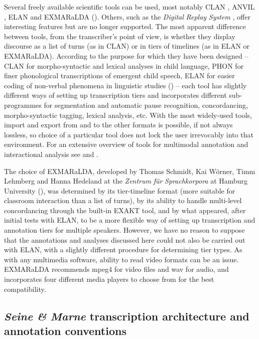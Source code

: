 \documentclass[output=paper,colorlinks,citecolor=brown,modfonts,nonflat]{../langscibook}
\begin{document}
Several freely available scientific tools can be used, most notably CLAN \citep{MacWhinney2000}, ANVIL \citep{Kipp2014}, ELAN \citep{WittenburgEtAl2006} and EXMARaLDA (\citealt{SchmidtWörner2014}). Others, such as the \textit{Digital} \textit{Replay} \textit{System} \citep{BrundellEtAl2008}, offer interesting features but are no longer supported. The most apparent difference between tools, from the transcriber’s point of view, is whether they display discourse as a list of turns (as in CLAN) or in tiers of timelines (as in ELAN or EXMARaLDA). According to the purpose for which they have been designed – CLAN for morpho-syntactic and lexical analyses in child language, PHON for finer phonological transcriptions of emergent child speech, ELAN for easier coding of non-verbal phenomena in linguistic studies (\citealt{LausbergSloetjes2009}) – each tool has slightly different ways of setting up transcription tiers and incorporates different sub-programmes for segmentation and automatic pause recognition, concordancing, morpho-syntactic tagging, lexical analysis, etc. With the most widely-used tools, import and export from and to the other formats is possible, if not always lossless, so choice of a particular tool does not lock the user irrevocably into that environment. For an extensive overview of tools for multimodal annotation and interactional analysis see \citet{CassidySchmidt2017} and \citet{Glüer2018}.

The choice of EXMARaLDA, developed by Thomas Schmidt, Kai Wörner, Timm Lehmberg and Hanna Hedeland at the \textit{Zentrum} \textit{für} \textit{Sprachkorpora} at Hamburg University (\citealt{SchmidtWörner2014}), was determined by its tier-timeline format (more suitable for classroom interaction than a list of turns), by its ability to handle multi-level concordancing through the built-in EXAKT tool, and by what appeared, after initial tests with ELAN, to be a more flexible way of setting up transcription and annotation tiers for multiple speakers. However, we have no reason to suppose that the annotations and analyses discussed here could not also be carried out with ELAN, with a slightly different procedure for determining tier types. As with any multimedia software, ability to read video formats can be an issue. EXMARaLDA recommends mpeg4 for video files and wav for audio, and incorporates four different media players to choose from for the best compatibility.

\subsection{\textit{Seine \&} \textit{Marne} transcription architecture and annotation conventions}
\end{document}
